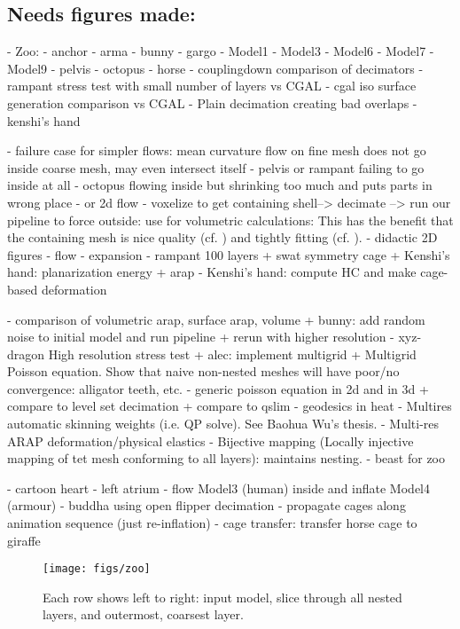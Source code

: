 \subsection{Needs figures made:}
- Zoo:
  - anchor
  - arma
  - bunny
  - gargo
  - Model1
  - Model3
  - Model6
  - Model7
  - Model9
  - pelvis
  - octopus
  - horse
- couplingdown comparison of decimators
- rampant stress test with small number of layers vs CGAL
- cgal iso surface generation comparison vs CGAL
- Plain decimation creating bad overlaps
- kenshi's hand


- failure case for simpler flows: mean curvature flow on fine mesh does not
  go inside coarse mesh, may even intersect itself
    - pelvis or rampant failing to go inside at all
    - octopus flowing inside but shrinking too much and puts parts in wrong
      place
    - or 2d flow
- voxelize to get containing shell--> decimate --> run our pipeline to force
  outside: use for volumetric calculations: This has the benefit that the
  containing mesh is nice quality (cf. \cite{Jacobson:WN:2013}) and tightly
  fitting (cf. \cite{Xu:2014:SDF}).
- didactic 2D figures
  - flow
  - expansion
- rampant 100 layers
+ swat symmetry cage
+ Kenshi's hand: planarization energy + arap
- Kenshi's hand: compute HC and make cage-based deformation

- comparison of volumetric arap, surface arap, volume
+ bunny: add random noise to initial model and run pipeline
  + rerun with higher resolution
- xyz-dragon High resolution stress test
+ alec: implement multigrid
  + Multigrid Poisson equation. Show that naive non-nested meshes will have
    poor/no convergence: alligator teeth, etc.
      - generic poisson equation in 2d and in 3d
        + compare to level set decimation
        + compare to qslim
      - geodesics in heat 
  - Multires automatic skinning weights (i.e. QP solve). See Baohua Wu's thesis.
  - Multi-res ARAP deformation/physical elastics
  - Bijective mapping (Locally injective mapping of tet mesh conforming to all
    layers): maintains nesting.
- beast for zoo

- cartoon heart
- left atrium
- flow Model3 (human) inside and inflate Model4 (armour)
- buddha using open flipper decimation
- propagate cages along animation sequence (just re-inflation)
- cage transfer: transfer horse cage to giraffe


\begin{figure*}
  \texttt{[image: figs/zoo]}
  \caption{Each row shows left to right: input model, slice through all nested
  layers, and outermost, coarsest layer.}
  \label{fig:zoo}
\end{figure*}
